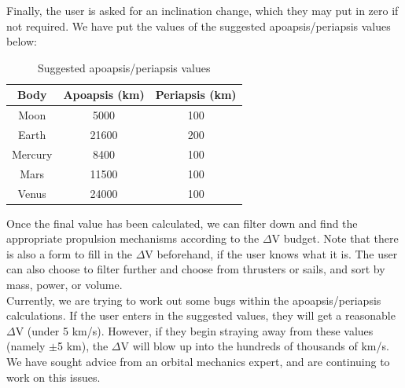 \documentclass[a4, 12 pt]{article} %
\begin{document}
\noindent Finally, the user is asked for an inclination change, which they may put in zero if not required. We have put the values of the suggested apoapsis/periapsis values below:
\begin{table}[H]
\caption{Suggested apoapsis/periapsis values}
\begin{center}
\begin{tabular}{|c|c|c|}
\hline
Body & Apoapsis (km)& Periapsis (km) \\
\hline
Moon & 5000 & 100 \\
Earth & 21600 & 200\\
Mercury & 8400 & 100\\
Mars & 11500 & 100\\
Venus & 24000 & 100\\
\hline
\end{tabular}
\end{center}
\label{default}
\end{table}%
%
\noindent Once the final value has been calculated, we can filter down and find the appropriate propulsion mechanisms according to the $\Delta$V budget. Note that there is also a form to fill in the $\Delta$V beforehand, if the user knows what it is. The user can also choose to filter further and choose from thrusters or sails, and sort by mass, power, or volume.\\[3mm]
Currently, we are trying to work out some bugs within the apoapsis/periapsis calculations. If the user enters in the suggested values, they will get a reasonable $\Delta$V (under 5 km/s). However, if they begin straying away from these values (namely $\pm$5 km), the $\Delta$V will blow up into the hundreds of thousands of km/s. We have sought advice from an orbital mechanics expert, and are continuing to work on this issues. 
\end{document}
